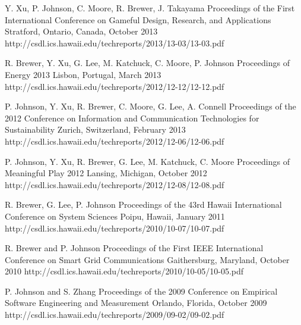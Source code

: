 \documentclass[11pt,letterpaper,sans]{moderncv} %
\begin{document}
          {Y. Xu, P. Johnson, C. Moore, R. Brewer, J. Takayama}
          {Proceedings of the First International Conference on Gameful Design, Research, and Applications}
          {Stratford, Ontario, Canada, October 2013}
          {http://csdl.ics.hawaii.edu/techreports/2013/13-03/13-03.pdf}

          {R. Brewer, Y. Xu, G. Lee, M. Katchuck, C. Moore, P. Johnson}
          {Proceedings of Energy 2013}
          {Lisbon, Portugal, March 2013}
          {http://csdl.ics.hawaii.edu/techreports/2012/12-12/12-12.pdf}

          {P. Johnson, Y. Xu, R. Brewer,  C. Moore,  G. Lee, A. Connell}
          {Proceedings of the 2012 Conference on Information and Communication Technologies for Sustainability}
          {Zurich, Switzerland, February 2013}
          {http://csdl.ics.hawaii.edu/techreports/2012/12-06/12-06.pdf}

          {P. Johnson, Y. Xu, R. Brewer, G. Lee, M. Katchuck, C. Moore}
          {Proceedings of Meaningful Play 2012}
          {Lansing, Michigan, October 2012}
          {http://csdl.ics.hawaii.edu/techreports/2012/12-08/12-08.pdf}

          {R. Brewer, G. Lee, P. Johnson}
          {Proceedings of the 43rd Hawaii International Conference on System Sciences}
          {Poipu, Hawaii, January 2011}
          {http://csdl.ics.hawaii.edu/techreports/2010/10-07/10-07.pdf}

          {R. Brewer and P. Johnson}
          {Proceedings of the First IEEE International Conference on Smart Grid Communications}
          {Gaithersburg, Maryland, October 2010}
          {http://csdl.ics.hawaii.edu/techreports/2010/10-05/10-05.pdf}

          {P. Johnson and S. Zhang}
          {Proceedings of the 2009 Conference on Empirical Software Engineering and Measurement}
          {Orlando, Florida, October 2009}
          {http://csdl.ics.hawaii.edu/techreports/2009/09-02/09-02.pdf}
\end{document}
